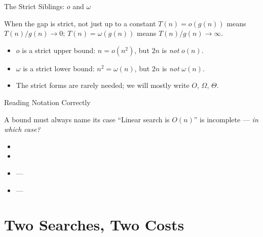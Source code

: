 \documentclass[aspectratio=169]{beamer}
\begin{document}
\begin{frame}{The Strict Siblings: $o$ and $\omega$}
  \begin{block}{When the gap is strict, not just up to a constant}
    $T(n) = o(g(n))$ means $T(n)/g(n) \to 0$; \quad
    $T(n) = \omega(g(n))$ means $T(n)/g(n) \to \infty$.
  \end{block}
  \begin{itemize}
    \item $o$ is a strict upper bound: $n = o(n^2)$, but $2n$ is \emph{not} $o(n)$.
    \item $\omega$ is a strict lower bound: $n^2 = \omega(n)$, but $2n$ is \emph{not} $\omega(n)$.
    \item The strict forms are rarely needed; we will mostly write $O$, $\Omega$, $\Theta$.
  \end{itemize}
\end{frame}

\begin{frame}{Reading Notation Correctly}
  \begin{block}{A bound must always name its case}
    ``Linear search is $O(n)$'' is incomplete --- \emph{in which case?}
  \end{block}
  \begin{itemize}
    \item {}
    \item {}
    \item {} --- 
    \item {} --- 
  \end{itemize}
\end{frame}


\section{Two Searches, Two Costs}

\end{document}
